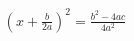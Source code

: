 \documentclass[preview]{standalone}
\begin{document}
\begin{align*}
{\left( x + \frac{b}{2 a} \right)}^{2} = \frac{{b}^{2} - 4 a c}{4 {a}^{2}}
\end{align*}
\end{document}
